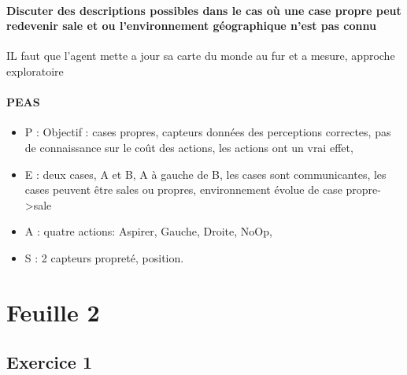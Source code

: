 \documentclass{article}
\begin{document}
\paragraph{Discuter des descriptions possibles dans le cas où une case propre peut redevenir sale et ou l'environnement géographique n'est pas connu} IL faut que l'agent mette a jour sa carte du monde au fur et a mesure, approche exploratoire
\paragraph{PEAS}
\begin{itemize}
\item P : Objectif : cases propres, capteurs données des perceptions correctes, pas de connaissance sur le coût des actions, les actions ont un vrai effet, 
\item E : deux cases, A et B, A à gauche de B, les cases sont communicantes, les cases peuvent être sales ou propres, environnement évolue de case propre->sale
\item A : quatre actions: Aspirer, Gauche, Droite, NoOp,
\item S : 2 capteurs propreté, position.
\end{itemize}

\section{Feuille 2}
\subsection{Exercice 1}
\end{document}
